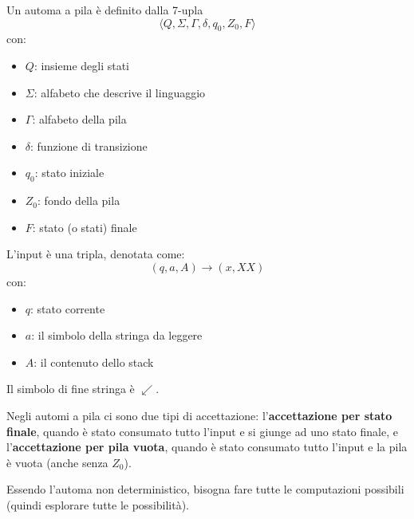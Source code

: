 \documentclass[11pt]{article}
\begin{document}
Un automa a pila è definito dalla 7-upla 
\begin{equation*}
    \langle Q,\Sigma,\Gamma,\delta,q_0,Z_0,F \rangle
\end{equation*}
con:
\begin{itemize}
    \item $Q$: insieme degli stati
    \item $\Sigma$: alfabeto che descrive il linguaggio
    \item $\Gamma$: alfabeto della pila 
    \item $\delta$: funzione di transizione
    \item $q_0$: stato iniziale 
    \item $Z_0$: fondo della pila 
    \item $F$: stato (o stati) finale
\end{itemize}
L'input è una tripla, denotata come:
\begin{equation*}
    (q,a,A)\rightarrow(x,XX)
\end{equation*}
con:
\begin{itemize}
    \item $q$: stato corrente
    \item $a$: il simbolo della stringa da leggere
    \item $A$: il contenuto dello stack
\end{itemize}
Il simbolo di fine stringa è $\swarrow$.

Negli automi a pila ci sono due tipi di accettazione: l'\textbf{accettazione per stato finale}, quando è stato consumato 
tutto l'input e si giunge ad uno stato finale, e l'\textbf{accettazione per pila vuota}, quando è stato consumato tutto 
l'input e la pila è vuota (anche senza $Z_0$).

Essendo l'automa non deterministico, bisogna fare tutte le computazioni possibili (quindi esplorare tutte le possibilità).
\end{document}
